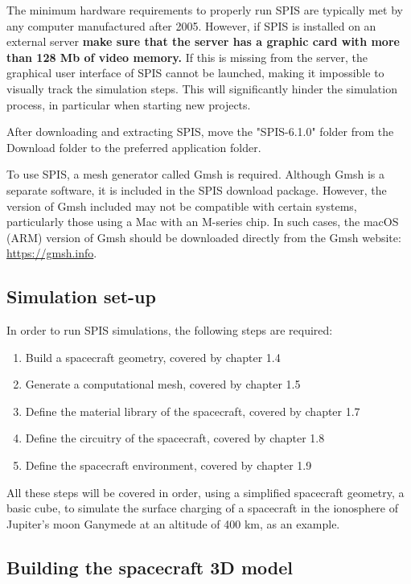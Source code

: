 \documentclass[a4paper, 11pt]{article}
\begin{document}
The minimum hardware requirements to properly run SPIS are typically met by any computer manufactured after 2005. However, if SPIS is installed on an external server \textbf{make sure that the server has a graphic card with more than 128 Mb of video memory.} If this is missing from the server, the graphical user interface of SPIS cannot be launched, making it impossible to visually track the simulation steps. This will significantly hinder the simulation process, in particular when starting new projects.\par
After downloading and extracting SPIS, move the "SPIS-6.1.0" folder from the Download folder to the preferred application folder.\par
To use SPIS, a mesh generator called Gmsh is required. Although Gmsh is a separate software, it is included in the SPIS download package. However, the version of Gmsh included may not be compatible with certain systems, particularly those using a Mac with an M-series chip. In such cases, the macOS (ARM) version of Gmsh should be downloaded directly from the Gmsh website: \url{https://gmsh.info}.

\subsection{Simulation set-up}

In order to run SPIS simulations, the following steps are required:
\begin{enumerate}
    \item Build a spacecraft geometry, covered by chapter 1.4
    \item Generate a computational mesh, covered by chapter 1.5
    \item Define the material library of the spacecraft, covered by chapter 1.7
    \item Define the circuitry of the spacecraft, covered by chapter 1.8
    \item Define the spacecraft environment, covered by chapter 1.9
\end{enumerate}
All these steps will be covered in order, using a simplified spacecraft geometry, a basic cube, to simulate the surface charging of a spacecraft in the ionosphere of Jupiter's moon Ganymede at an altitude of 400 km, as an example.

\subsection{Building the spacecraft 3D model}
\end{document}
